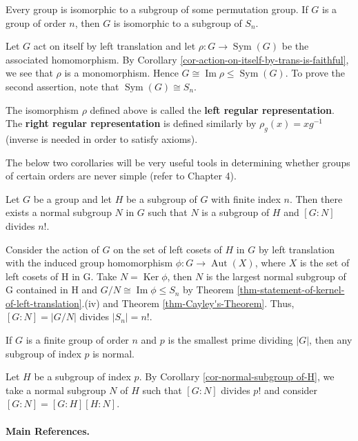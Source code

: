 \newpage
\begin{theorem} \label{thm-Cayley's-Theorem}
	Every group is isomorphic to a subgroup of some permutation group. If $G$ is a group of order $n$, then $G$ is isomorphic to a subgroup of $S_n$.
\end{theorem}
\begin{sketch}
	Let $G$ act on itself by left translation and let $\rho:G\rightarrow \operatorname{Sym}(G)$ be the associated homomorphism. By Corollary \ref{cor-action-on-itself-by-trans-is-faithful}, we see that $\rho$ is a monomorphism. Hence $G\cong \operatorname{Im}\rho \leq \operatorname{Sym}(G)$. To prove the second assertion, note that $\operatorname{Sym}(G) \cong S_n$.
\end{sketch}
\begin{definition}
	The isomorphism $\rho$ defined above is called the \textbf{left regular representation}. The \textbf{right regular representation} is defined similarly by $\rho_g(x) = xg^{-1}$ (inverse is needed in order to satisfy axioms). 
\end{definition}

The below two corollaries will be very useful tools in determining whether groups of certain orders are never simple (refer to Chapter 4).

\begin{corollary}\label{cor-normal-subgroup of-H}
	Let $G$ be a group and let $H$ be a subgroup of $G$ with finite index $n$. Then there exists a normal subgroup $N$ in $G$ such that $N$ is a subgroup of $H$ and $[G:N]$ divides $n!$.
\end{corollary}
\begin{sketch}
	Consider the action of $G$ on the set of left cosets of $H$ in $G$ by left translation with the induced group homomorphism $\phi : G \rightarrow \operatorname{Aut}(X)$, where $X$ is the set of left cosets of H in G. Take $N = \operatorname{Ker}\phi$, then $N$ is the largest normal subgroup of G contained in H and $G/N \cong \operatorname{Im}\phi \leq S_n$ by Theorem \ref{thm-statement-of-kernel-of-left-translation}.(iv) and Theorem \ref{thm-Cayley's-Theorem}. Thus, $[G:N] = |G/N|$ divides $|S_n| = n!$.
\end{sketch}
\begin{corollary}
	If $G$ is a finite group of order $n$ and $p$ is the smallest prime dividing $|G|$,
	then any subgroup of index $p$ is normal.
\end{corollary}
\begin{sketch}
	Let $H$ be a subgroup of index $p$. By Corollary \ref{cor-normal-subgroup of-H}, we take a normal subgroup $N$ of $H$ such that $[G:N]$ divides $p!$ and consider $[G:N] = [G:H][H:N]$.
\end{sketch}

\paragraph{Main References.} \cite{DummitFoote2004,Rotman1995,Hungerford1974,Isaacs2009}


